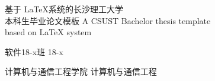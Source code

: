 
\thesisTitle
{基于 \LaTeX 系统的长沙理工大学\\本科生毕业论文模板}  %
{A CSUST Bachelor thesis template\\based on \LaTeX{} system} %




\stuClass
{软件18-x班} %
{18-x}  %



\stuCollege
{计算机与通信工程学院} %
{计算机与通信工程} %

\integrityStatementAuthor{} %
\integrityStatementDate{}{}{} %






